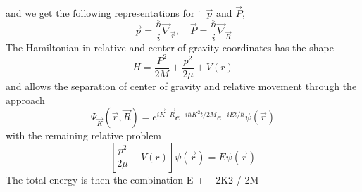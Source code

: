 and we get the following representations for ¨ $\vec{p}$ and $\vec{P}$,
\begin{equation}
    \vec{p}=\frac{\hbar}{i} \vec{\nabla}_{\vec{r}}, \quad \vec{P}=\frac{\hbar}{i} \vec{\nabla}_{\vec{R}}
    \end{equation}
The Hamiltonian in relative and center of gravity coordinates has the shape
\begin{equation}
    H=\frac{P^{2}}{2 M}+\frac{p^{2}}{2 \mu}+V(r)
    \end{equation}
and allows the separation of center of gravity and relative movement through the approach
\begin{equation}
    \Psi_{\vec{K}}(\vec{r}, \vec{R})=e^{i \vec{K} \cdot \vec{R}} e^{-i \hbar K^{2} t / 2 M} e^{-i E t / \hbar} \psi(\vec{r})
    \end{equation}
with the remaining relative problem
\begin{equation}
    \left[\frac{p^{2}}{2 \mu}+V(r)\right] \psi(\vec{r})=E \psi(\vec{r})
    \end{equation}
The total energy is then the combination E + ~ 2K2 / 2M


